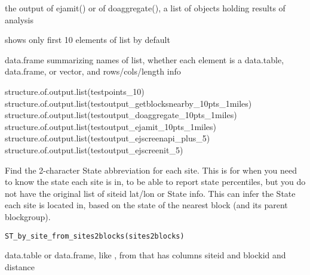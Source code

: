 \documentclass[a4paper]{book}
\begin{document}
%
\begin{Arguments}
\begin{ldescription}
\item[\code{x}] the output of ejamit() or of doaggregate(),
a list of objects holding results of analysis

\item[\code{maxshown}] shows only first 10 elements of list by default
\end{ldescription}
\end{Arguments}
%
\begin{Value}
data.frame summarizing names of list, whether each element is a
data.table, data.frame, or vector, and rows/cols/length info
\end{Value}
%
\begin{Examples}
\begin{ExampleCode}
 
  structure.of.output.list(testpoints_10)
  structure.of.output.list(testoutput_getblocksnearby_10pts_1miles)
  structure.of.output.list(testoutput_doaggregate_10pts_1miles)
  structure.of.output.list(testoutput_ejamit_10pts_1miles)
  structure.of.output.list(testoutput_ejscreenapi_plus_5)
  structure.of.output.list(testoutput_ejscreenit_5)
  
\end{ExampleCode}
\end{Examples}
%
\begin{Description}\relax
Find the 2-character State abbreviation for each site. This is for when you need to know
the state each site is in, to be able to report state percentiles, but you do not have
the original list of siteid lat/lon or State info. This can infer the State
each site is located in, based on the state of the nearest block (and its parent blockgroup).
\end{Description}
%
\begin{Usage}
\begin{verbatim}
ST_by_site_from_sites2blocks(sites2blocks)
\end{verbatim}
\end{Usage}
%
\begin{Arguments}
\begin{ldescription}
\item[\code{sites2blocks}] data.table or data.frame, like ,
from  that has columns siteid and blockid and distance
\end{ldescription}
\end{Arguments}
\end{document}

